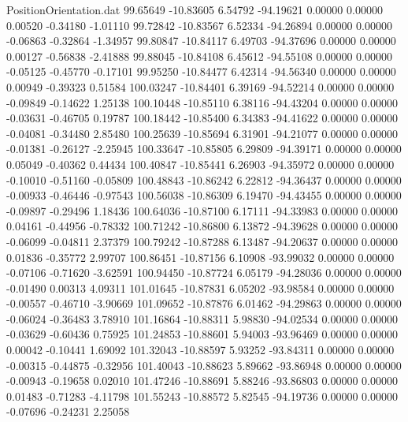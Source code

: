 \begin{filecontents}{PositionOrientation.dat}
  99.65649  -10.83605    6.54792   -94.19621    0.00000    0.00000    0.00520   -0.34180   -1.01110
  99.72842  -10.83567    6.52334   -94.26894    0.00000    0.00000   -0.06863   -0.32864   -1.34957
  99.80847  -10.84117    6.49703   -94.37696    0.00000    0.00000    0.00127   -0.56838   -2.41888
  99.88045  -10.84108    6.45612   -94.55108    0.00000    0.00000   -0.05125   -0.45770   -0.17101
  99.95250  -10.84477    6.42314   -94.56340    0.00000    0.00000    0.00949   -0.39323    0.51584
 100.03247  -10.84401    6.39169   -94.52214    0.00000    0.00000   -0.09849   -0.14622    1.25138
 100.10448  -10.85110    6.38116   -94.43204    0.00000    0.00000   -0.03631   -0.46705    0.19787
 100.18442  -10.85400    6.34383   -94.41622    0.00000    0.00000   -0.04081   -0.34480    2.85480
 100.25639  -10.85694    6.31901   -94.21077    0.00000    0.00000   -0.01381   -0.26127   -2.25945
 100.33647  -10.85805    6.29809   -94.39171    0.00000    0.00000    0.05049   -0.40362    0.44434
 100.40847  -10.85441    6.26903   -94.35972    0.00000    0.00000   -0.10010   -0.51160   -0.05809
 100.48843  -10.86242    6.22812   -94.36437    0.00000    0.00000   -0.00933   -0.46446   -0.97543
 100.56038  -10.86309    6.19470   -94.43455    0.00000    0.00000   -0.09897   -0.29496    1.18436
 100.64036  -10.87100    6.17111   -94.33983    0.00000    0.00000    0.04161   -0.44956   -0.78332
 100.71242  -10.86800    6.13872   -94.39628    0.00000    0.00000   -0.06099   -0.04811    2.37379
 100.79242  -10.87288    6.13487   -94.20637    0.00000    0.00000    0.01836   -0.35772    2.99707
 100.86451  -10.87156    6.10908   -93.99032    0.00000    0.00000   -0.07106   -0.71620   -3.62591
 100.94450  -10.87724    6.05179   -94.28036    0.00000    0.00000   -0.01490    0.00313    4.09311
 101.01645  -10.87831    6.05202   -93.98584    0.00000    0.00000   -0.00557   -0.46710   -3.90669
 101.09652  -10.87876    6.01462   -94.29863    0.00000    0.00000   -0.06024   -0.36483    3.78910
 101.16864  -10.88311    5.98830   -94.02534    0.00000    0.00000   -0.03629   -0.60436    0.75925
 101.24853  -10.88601    5.94003   -93.96469    0.00000    0.00000    0.00042   -0.10441    1.69092
 101.32043  -10.88597    5.93252   -93.84311    0.00000    0.00000   -0.00315   -0.44875   -0.32956
 101.40043  -10.88623    5.89662   -93.86948    0.00000    0.00000   -0.00943   -0.19658    0.02010
 101.47246  -10.88691    5.88246   -93.86803    0.00000    0.00000    0.01483   -0.71283   -4.11798
 101.55243  -10.88572    5.82545   -94.19736    0.00000    0.00000   -0.07696   -0.24231    2.25058

\end{filecontents}
